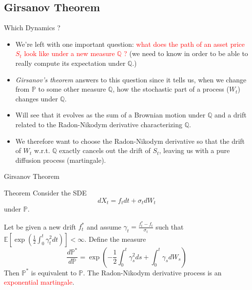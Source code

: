\documentclass{beamer}
\begin{document}
\subsection{Girsanov Theorem}
\begin{frame}{Which Dynamics ?}
  \begin{itemize}
  \item<1-> We're left with one important question:
    \textcolor{red}{what does the path of an asset price $S_t$ look like under a new measure $\mathbb{Q}$ ?} (we need to know in order to be able to really compute its expectation under $\mathbb{Q}$.)
  \item<2-> \emph{Girsanov's theorem} answers to this question since it tells us, when we change from $\mathbb{P}$ to some other measure $\mathbb{Q}$, how the stochastic part of a process ($W_t$) changes under $\mathbb{Q}$.
  \item<3-> Will see that it evolves as the sum of a Brownian motion under $\mathbb{Q}$ and a drift related to the Radon-Nikodym derivative characterizing $\mathbb{Q}$.
  \item<4-> We therefore want to choose the Radon-Nikodym derivative so that the drift of $W_t$ w.r.t. $\mathbb{Q}$ exactly cancels out the drift of $S_t$, leaving us with a pure diffusion process (martingale). 
  \end{itemize}
\end{frame}

\begin{frame}{Girsanov Theorem}
  \begin{block}{Theorem}
    Consider the SDE 
    \begin{equation*}
      dX_t = f_t dt + \sigma_t dW_t
    \end{equation*}
    under $\mathbb{P}$. 
    
    Let be given a new drift $f^*_t$ and assume $\gamma_t=\frac{f_t^*-f_t}{\sigma_t}$ such that $\mathbb{E}\left[\exp\left(\frac{1}{2}\int_0^t\gamma_t^2dt\right)\right]<\infty$.
    Define the measure 
    \begin{equation}
      \frac{d\mathbb{P}^*}{d\mathbb{P}}=\exp\left(-\frac{1}{2}\int_0^t \gamma_s^2 ds + \int_0^t \gamma_s dW_s \right)
    \end{equation}
    Then $\mathbb{P}^*$ is equivalent to $\mathbb{P}$. 
    The Radon-Nikodym derivative process is an \textcolor{red}{exponential martingale}.
  \end{block}
\end{frame}
\end{document}
